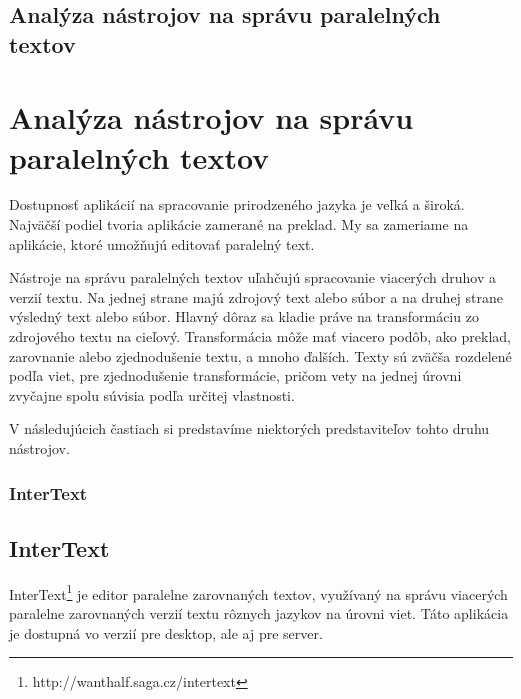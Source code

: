 \newpage
%
%
{
	\section{Analýza nástrojov na správu paralelných textov} 
}
{
	\chapter{Analýza nástrojov na správu paralelných textov}
}
Dostupnosť aplikácií na spracovanie prirodzeného jazyka je veľká a široká. Najväčší podiel tvoria aplikácie zamerané na preklad. My sa zameriame na aplikácie, ktoré umožňujú editovať paralelný text.

Nástroje na správu paralelných textov uľahčujú spracovanie viacerých druhov a verzií textu. Na jednej strane majú zdrojový text alebo súbor a na druhej strane výsledný text alebo súbor. Hlavný dôraz sa kladie práve na transformáciu zo zdrojového textu na cieľový. Transformácia môže mať viacero podôb, ako preklad, zarovnanie alebo zjednodušenie textu, a mnoho ďalších. Texty sú zväčša rozdelené podľa viet, pre zjednodušenie transformácie, pričom vety na jednej úrovni zvyčajne spolu súvisia podľa určitej vlastnosti.

V následujúcich častiach si predstavíme niektorých predstaviteľov tohto druhu nástrojov.

%
%
{
	\subsection{InterText}
}
{
	\section{InterText}
}
InterText\footnote{http://wanthalf.saga.cz/intertext} je editor paralelne zarovnaných textov, využívaný na správu viacerých paralelne zarovnaných verzií textu rôznych jazykov na úrovni viet. Táto aplikácia je dostupná vo verzií pre desktop, ale aj pre server.

